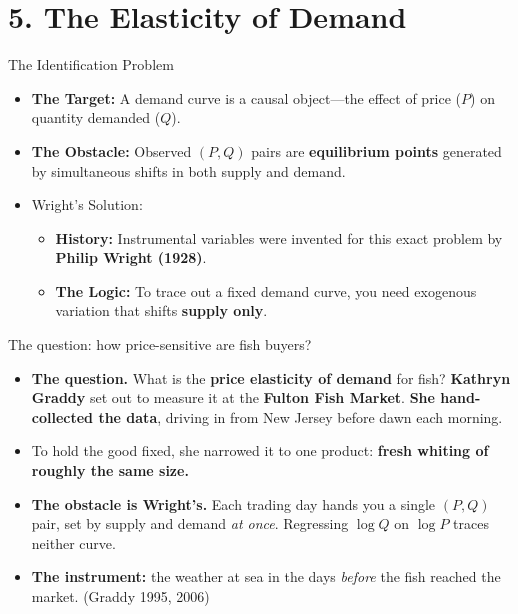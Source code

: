 \documentclass[
  11pt,
  ignorenonframetext,
  aspectratio=169,
]{beamer}
\providecommand{\tightlist}{%
  \setlength{\itemsep}{0pt}\setlength{\parskip}{0pt}}
\begin{document}
\section{5. The Elasticity of Demand}\label{the-elasticity-of-demand}

\begin{frame}{The Identification Problem}
\protect{}\label{the-identification-problem}
\begin{itemize}
\tightlist
\item
  \textbf{The Target:} A demand curve is a causal object---the effect of
  price (\(P\)) on quantity demanded (\(Q\)).
\item
  \textbf{The Obstacle:} Observed \((P, Q)\) pairs are
  \textbf{equilibrium points} generated by simultaneous shifts in both
  supply and demand.
\item
  Wright's Solution:

  \begin{itemize}
  \tightlist
  \item
    \textbf{History:} Instrumental variables were invented for this
    exact problem by \textbf{Philip Wright (1928)}.
  \item
    \textbf{The Logic:} To trace out a fixed demand curve, you need
    exogenous variation that shifts \textbf{supply only}.
  \end{itemize}
\end{itemize}
\end{frame}

\begin{frame}{The question: how price-sensitive are fish buyers?}
\protect{}\label{the-question-how-price-sensitive-are-fish-buyers}
\begin{itemize}
\tightlist
\item
  \textbf{The question.} What is the \textbf{price elasticity of demand}
  for fish? \textbf{Kathryn Graddy} set out to measure it at the
  \textbf{Fulton Fish Market}. \textbf{She hand-collected the data},
  driving in from New Jersey before dawn each morning.
\item
  To hold the good fixed, she narrowed it to one product: \textbf{fresh
  whiting of roughly the same size.}
\end{itemize}

\vspace{0.3em}

\begin{itemize}
\tightlist
\item
  \textbf{The obstacle is Wright's.} Each trading day hands you a single
  \((P,Q)\) pair, set by supply and demand \emph{at once}. Regressing
  \(\log Q\) on \(\log P\) traces neither curve.
\item
  \textbf{The instrument:} the weather at sea in the days \emph{before}
  the fish reached the market. (Graddy 1995, 2006)
\end{itemize}
\end{frame}
\end{document}
